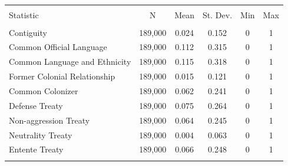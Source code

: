 \documentclass{article}
\begin{document}
\begin{table}[!htbp] \centering 
  \caption{} 
  \label{} 
\begin{tabular}{@{\extracolsep{5pt}}lccccc} 
\\[-1.8ex]\hline 
\hline \\[-1.8ex] 
Statistic & \multicolumn{1}{c}{N} & \multicolumn{1}{c}{Mean} & \multicolumn{1}{c}{St. Dev.} & \multicolumn{1}{c}{Min} & \multicolumn{1}{c}{Max} \\ 
\hline \\[-1.8ex] 
Contiguity & 189,000 & 0.024 & 0.152 & 0 & 1 \\ 
Common Official Language & 189,000 & 0.112 & 0.315 & 0 & 1 \\ 
Common Language and Ethnicity & 189,000 & 0.115 & 0.318 & 0 & 1 \\ 
Former Colonial Relationship & 189,000 & 0.015 & 0.121 & 0 & 1 \\ 
Common Colonizer & 189,000 & 0.062 & 0.241 & 0 & 1 \\ 
Defense Treaty & 189,000 & 0.075 & 0.264 & 0 & 1 \\ 
Non-aggression Treaty & 189,000 & 0.064 & 0.245 & 0 & 1 \\ 
Neutrality Treaty & 189,000 & 0.004 & 0.063 & 0 & 1 \\ 
Entente Treaty & 189,000 & 0.066 & 0.248 & 0 & 1 \\ 
\hline \\[-1.8ex] 
\end{tabular} 
\end{table} 
\end{document}
